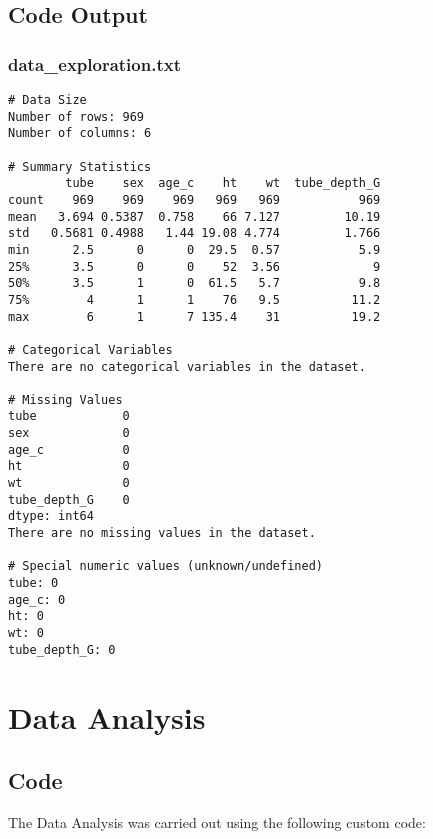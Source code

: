 \documentclass[11pt]{article}
\begin{document}
\subsection{Code Output}

\subsubsection*{data\_exploration.txt}

\begin{Verbatim}[tabsize=4]
# Data Size
Number of rows: 969
Number of columns: 6

# Summary Statistics
        tube    sex  age_c    ht    wt  tube_depth_G
count    969    969    969   969   969           969
mean   3.694 0.5387  0.758    66 7.127         10.19
std   0.5681 0.4988   1.44 19.08 4.774         1.766
min      2.5      0      0  29.5  0.57           5.9
25%      3.5      0      0    52  3.56             9
50%      3.5      1      0  61.5   5.7           9.8
75%        4      1      1    76   9.5          11.2
max        6      1      7 135.4    31          19.2

# Categorical Variables
There are no categorical variables in the dataset.

# Missing Values
tube            0
sex             0
age_c           0
ht              0
wt              0
tube_depth_G    0
dtype: int64
There are no missing values in the dataset.

# Special numeric values (unknown/undefined)
tube: 0
age_c: 0
ht: 0
wt: 0
tube_depth_G: 0

\end{Verbatim}

\section{Data Analysis}
\subsection{{Code}}
The Data Analysis was carried out using the following custom code:
\end{document}
